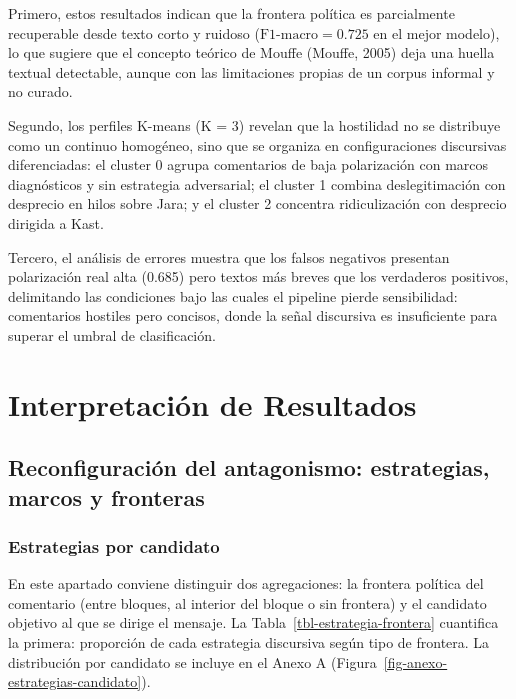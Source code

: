 \documentclass[
  letterpaper,
  numbers=noendperiod,
  fontsize=11pt,
  DIV=12,
  titlepage=false]{scrreprt}
\begin{document}
Primero, estos resultados indican que la frontera política es
parcialmente recuperable desde texto corto y ruidoso
(\(\mbox{F1-macro} = 0.725\) en el mejor modelo), lo que sugiere que el
concepto teórico de Mouffe (Mouffe, 2005) deja una huella textual
detectable, aunque con las limitaciones propias de un corpus informal y
no curado.

Segundo, los perfiles K-means (K = 3) revelan que la hostilidad no se
distribuye como un continuo homogéneo, sino que se organiza en
configuraciones discursivas diferenciadas: el cluster 0 agrupa
comentarios de baja polarización con marcos diagnósticos y sin
estrategia adversarial; el cluster 1 combina deslegitimación con
desprecio en hilos sobre Jara; y el cluster 2 concentra ridiculización
con desprecio dirigida a Kast.

Tercero, el análisis de errores muestra que los falsos negativos
presentan polarización real alta (0.685) pero textos más breves que los
verdaderos positivos, delimitando las condiciones bajo las cuales el
pipeline pierde sensibilidad: comentarios hostiles pero concisos, donde
la señal discursiva es insuficiente para superar el umbral de
clasificación.


\chapter{Interpretación de
Resultados}\label{interpretaciuxf3n-de-resultados}

\section{Reconfiguración del antagonismo: estrategias, marcos y
fronteras}\label{reconfiguraciuxf3n-del-antagonismo-estrategias-marcos-y-fronteras}

\subsection{Estrategias por candidato}\label{estrategias-por-candidato}

En este apartado conviene distinguir dos agregaciones: la frontera
política del comentario (entre bloques, al interior del bloque o sin
frontera) y el candidato objetivo al que se dirige el mensaje. La
Tabla~\ref{tbl-estrategia-frontera} cuantifica la primera: proporción de
cada estrategia discursiva según tipo de frontera. La distribución por
candidato se incluye en el Anexo A
(Figura~\ref{fig-anexo-estrategias-candidato}).
\end{document}
